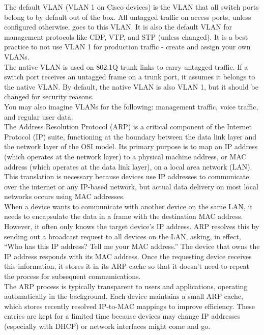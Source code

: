 \documentclass{article}
\begin{document}
The default VLAN (VLAN 1 on Cisco devices) is the VLAN that all switch ports belong to by default out of the box. All untagged traffic on access ports, unless configured otherwise, goes to this VLAN. It is also the default VLAN for management protocols like CDP, VTP, and STP (unless changed). It is a best practice to not use VLAN 1 for production traffic - create and assign your own VLANs.\\

The native VLAN is used on 802.1Q trunk links to carry untagged traffic. If a switch port receives an untagged frame on a trunk port, it assumes it belongs to the native VLAN. By default, the native VLAN is also VLAN 1, but it should be changed for security reasons.\\

You may also imagine VLANs for the following: management traffic, voice traffic, and regular user data.\\

The Address Resolution Protocol (ARP) is a critical component of the Internet Protocol (IP) suite, functioning at the boundary between the data link layer and the network layer of the OSI model. Its primary purpose is to map an IP address (which operates at the network layer) to a physical machine address, or MAC address (which operates at the data link layer), on a local area network (LAN). This translation is necessary because devices use IP addresses to communicate over the internet or any IP-based network, but actual data delivery on most local networks occurs using MAC addresses.\\

When a device wants to communicate with another device on the same LAN, it needs to encapsulate the data in a frame with the destination MAC address. However, it often only knows the target device’s IP address. ARP resolves this by sending out a broadcast request to all devices on the LAN, asking, in effect, “Who has this IP address? Tell me your MAC address.” The device that owns the IP address responds with its MAC address. Once the requesting device receives this information, it stores it in its ARP cache so that it doesn't need to repeat the process for subsequent communications.\\

The ARP process is typically transparent to users and applications, operating automatically in the background. Each device maintains a small ARP cache, which stores recently resolved IP-to-MAC mappings to improve efficiency. These entries are kept for a limited time because devices may change IP addresses (especially with DHCP) or network interfaces might come and go.\\
\end{document}
